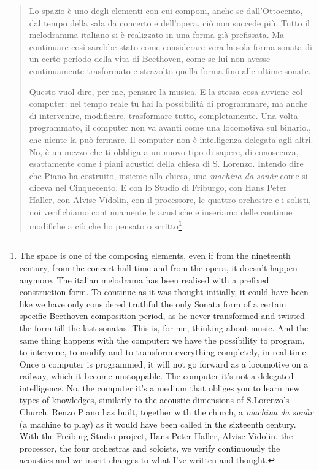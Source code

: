 \documentclass[twoside,a4paper]{article}
\begin{document}
\begin{quote}
Lo spazio è uno degli elementi con cui componi, anche se dall'Ottocento, dal tempo della sala da concerto e dell'opera, ciò non succede più. 
Tutto il melodramma italiano si è realizzato in una forma già prefissata. Ma continuare così sarebbe stato come considerare vera la sola forma sonata di un certo periodo della vita di Beethoven, come se lui non avesse continuamente trasformato e stravolto quella forma fino alle ultime sonate. 

Questo vuol dire, per me, pensare la musica. E la stessa cosa avviene col computer: nel tempo reale tu hai la possibilità di programmare, ma anche di intervenire, modificare, trasformare tutto, completamente. Una volta programmato, il computer non va avanti come una locomotiva sul binario., che niente la può fermare. Il computer non è intelligenza delegata agli altri. No, è un mezzo che ti obbliga a un nuovo tipo di sapere, di conoscenza, esattamente come i piani acustici della chiesa di S. Lorenzo. Intendo dire che Piano ha costruito, insieme alla chiesa, una \emph{machina da sonàr} come si diceva nel Cinquecento. E con lo Studio di Friburgo, con Hans Peter Haller, con Alvise Vidolin, con il processore, le quattro orchestre e i solisti, noi verifichiamo continuamente le acustiche e inseriamo delle continue modifiche a ciò che ho pensato o scritto\cite{nono2}\footnote{The space is one of the composing elements, even if from the nineteenth century, from the concert hall time and from the opera, it doesn’t happen anymore. The italian melodrama has been realised with a prefixed construction form. To continue as it was thought initially, it could have been like we have only considered truthful the only Sonata form of a certain specific Beethoven composition period, as he never transformed and twisted the form till the last sonatas. This is, for me, thinking about music. And the same thing happens with the computer: we have the possibility to program, to intervene, to modify and to transform everything completely, in real time. Once a computer is programmed, it will not go forward as a locomotive on a railway, which it become unstoppable. The computer it’s not a delegated intelligence. No, the computer it’s a medium that obliges you to learn new types of knowledges, similarly to the acoustic dimensions of S.Lorenzo’s Church. Renzo Piano has built, together with the church, a \emph{machina da sonàr} (a machine to play) as it would have been called in the sixteenth century. With the Freiburg Studio project, Hans Peter Haller, Alvise Vidolin, the processor, the four orchestras and soloists, we verify continuously the acoustics and we insert changes to what I’ve written and thought.}. 
\end{quote}
\end{document}
